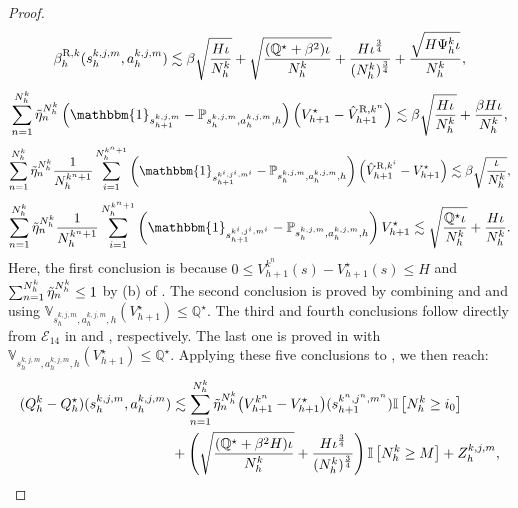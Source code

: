 \documentclass{article}
\newcommand{\R}{\textnormal{R}}
\begin{document}
\begin{proof}
\begin{align*}
    \beta_h^{\R,k}(s_h^{k,j,m}, a_h^{k,j,m})
    \lesssim \beta \sqrt{\frac{H\iota}{N_h^k}} + \sqrt{\frac{(\mathbb{Q}^{\star}+\beta^2)\iota}{N_h^k}}+   \frac{H\iota^{\frac{3}{4}}}{(N_h^k)^{\frac{3}{4}}} +\frac{\sqrt{H\Psi_h^k\iota}}{N_h^k} ,
\end{align*}
\begin{align*}
    \sum_{n=1}^{N_h^k} \Tilde{\eta}_n^{N_h^k}\left(\mathbbm{1}_{s_{h+1}^{k,j,m}}-\mathbb{P}_{s_h^{k,j,m}, a_h^{k,j,m},h}\right)\left(V_{h+1}^{\star}-\hat{V}_{h+1}^{\R,k^n}\right)
    \lesssim \beta \sqrt{\frac{H\iota}{N_h^k}} + \frac{\beta H\iota}{N_h^k},
\end{align*}
\begin{align*}
    \sum_{n=1}^{N_h^k} \Tilde{\eta}_n^{N_h^k}\frac{1}{N_h^{k^n+1}} \sum_{i=1}^{N_h^{k^n+1}}\left(\mathbbm{1}_{s_{h+1}^{k^i,j^i,m^i}}-\mathbb{P}_{s_h^{k,j,m}, a_h^{k,j,m},h}\right)\left(\hat{V}_{h+1}^{\R,k^i}-V_{h+1}^{\star}\right)
    \lesssim \beta \sqrt{\frac{\iota}{N_h^k}},
\end{align*}
\begin{align*}
    \sum_{n=1}^{N_h^k} \Tilde{\eta}_n^{N_h^k}\frac{1}{N_h^{k^n+1}} \sum_{i=1}^{N_h^{k^n+1}}\left(\mathbbm{1}_{s_{h+1}^{k^i,j^i,m^i}}-\mathbb{P}_{s_h^{k,j,m}, a_h^{k,j,m},h}\right)V_{h+1}^{\star} \lesssim \sqrt{\frac{\mathbb{Q}^{\star}\iota}{N_h^k}} + \frac{H\iota}{N_h^k}.
\end{align*}
Here, the first conclusion is because $0\leq V_{h+1}^{k^n}(s)-V_{h+1}^{\star}(s) \leq H$ and $\sum_{n=1}^{N_h^k} \Tilde{\eta}_n^{N_h^k} \leq 1$ by (b) of . The second conclusion is proved by combining  and  and using $\mathbb{V}_{s_h^{k,j,m}, a_h^{k,j,m}, h} (V_{h+1}^{\star}) \leq \mathbb{Q}^{\star}$. The third and fourth conclusions follow directly from $\mathcal{E}_{14}$ in  and , respectively. The last one is proved in  with $\mathbb{V}_{s_h^{k,j,m}, a_h^{k,j,m}, h} (V_{h+1}^{\star}) \leq \mathbb{Q}^{\star}$. Applying these five conclusions to , we then reach:
\begin{align*}
        (Q_h^{k} - Q_h^{\star})(s_h^{k,j,m}, a_h^{k,j,m}) &\lesssim \sum_{n=1}^{N_h^k} \Tilde{\eta}_n^{N_h^k}  \big(V_{h+1}^{k^n}-V_{h+1}^{\star}\big)(s_{h+1}^{k^n,j^n,m^n})\mathbb{I}\left[N_h^k \geq i_0 \right]\nonumber\\
        & + \left(\sqrt{\frac{(\mathbb{Q^{\star}}+\beta^2H)\iota}{N_h^k}} +\frac{H\iota^{\frac{3}{4}}}{(N_h^k)^{\frac{3}{4}}}\right)\mathbb{I}\left[N_h^k \geq M \right] + Z_{h}^{k,j,m},

\end{align*}
\end{proof}
\end{document}
